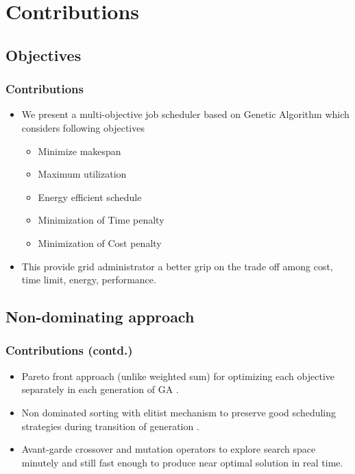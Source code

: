 \documentclass{beamer}
\begin{document}
\section[Contributions]{Contributions}
\subsection*{Objectives}
\begin{frame}[label=multipleobj]
 \frametitle{Contributions}
 \begin{itemize}
	\item We present a multi-objective job scheduler based on Genetic Algorithm which considers following objectives
	\begin{itemize}
	 \item Minimize makespan
	 \item Maximum utilization
	 \item Energy efficient schedule
	 \item Minimization of Time penalty
	 \item Minimization of Cost penalty
	\end{itemize}
	\item This provide grid administrator a better grip on the trade off among cost, time limit, energy, performance.\hyperlink{back3}{}
\end{itemize}
\end{frame}

\subsection*{Non-dominating approach}
\begin{frame}[label=back4]
 \frametitle{Contributions (contd.)}
 \begin{itemize}
	\item Pareto front approach (unlike weighted sum) for optimizing each objective separately in each generation of GA \hyperlink{paretofrnt}{}.
	\item Non dominated sorting with elitist mechanism to preserve good scheduling strategies during transition of generation \hyperlink{nds}{}.
	\item Avant-garde crossover and mutation operators to explore search space minutely and still fast enough to produce near optimal solution in real time.
\end{itemize}
\end{frame}
\end{document}
